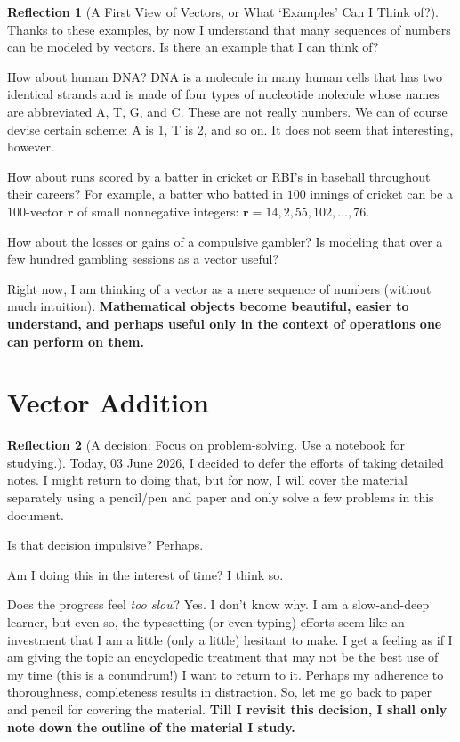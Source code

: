 \documentclass[11pt]{book}
\theoremstyle{definition}
\theoremstyle{plain}
\theoremstyle{problemstyle}
\theoremstyle{remark}
\theoremstyle{definition}
\newtheorem{reflection}{Reflection}
\begin{document}
\begin{reflection}[A First View of Vectors, or What `Examples' Can I Think of?]
    \label{reflection:first-view-of-vectors}
    Thanks to these examples, by now I understand that many sequences of numbers can be modeled by vectors. Is there an example that I can think of? 

    How about human DNA? DNA is a molecule in many human cells that has two identical strands and is made of four types of nucleotide molecule whose names are abbreviated A, T, G, and C. These are not really numbers. We can of course devise certain scheme: A is 1, T is 2, and so on. It does not seem that interesting, however. 

    How about runs scored by a batter in cricket or RBI's in baseball throughout their careers? For example, a batter who batted in $100$ innings of cricket can be a $100$-vector $\boldsymbol{r}$ of small nonnegative integers: $\boldsymbol{r}=14,2,55,102,\dots,76$.

    How about the losses or gains of a compulsive gambler? Is modeling that over a few hundred gambling sessions as a vector useful?

    Right now, I am thinking of a vector as a mere sequence of numbers (without much intuition). \textbf{Mathematical objects become beautiful, easier to understand, and perhaps useful only in the context of operations one can perform on them.}
\end{reflection}


\section{Vector Addition}
\label{s:vector-addition}

\begin{reflection}[A decision: Focus on problem-solving. Use a notebook for studying.]
    Today, 03 June 2026, I decided to defer the efforts of taking detailed notes. I might return to doing that, but for now, I will cover the material separately using a pencil/pen and paper and only solve a few problems in this document. 

    Is that decision impulsive? Perhaps.

    Am I doing this in the interest of time? I think so.

    Does the progress feel \emph{too slow}? Yes. I don't know why. I am a slow-and-deep learner, but even so, the typesetting (or even typing) efforts seem like an investment that I am a little (only a little) hesitant to make. I get a feeling as if I am giving the topic an encyclopedic treatment that may not be the best use of my time (this is a conundrum!) I want to return to it. Perhaps my adherence to thoroughness, completeness results in distraction. So, let me go back to paper and pencil for covering the material. \textbf{Till I revisit this decision, I shall only note down the outline of the material I study.}
\end{reflection}
\end{document}
